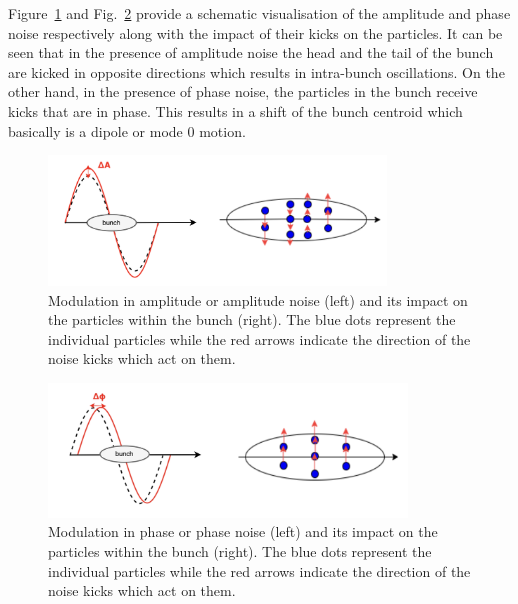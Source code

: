 Figure~\ref{fig:amplitude_noise} and Fig.~\ref{fig:phase_noise} provide a schematic visualisation of the amplitude and phase noise respectively along with the impact of their kicks on the particles. It can be seen that in the presence of amplitude noise the head and the tail of the bunch are kicked in opposite directions which results in intra-bunch oscillations. On the other hand, in the presence of phase noise, the particles in the bunch receive kicks that are in phase. This results in a shift of the bunch centroid which basically is a dipole or mode 0 motion.

\begin{figure}[!h] %
    \centering         
    \includegraphics[width=0.8\textwidth]{images/Ch3/amplitude_noise.png}
        \caption{Modulation in amplitude or amplitude noise (left) and its impact on the particles within the bunch (right). The blue dots represent the individual particles while the red arrows indicate the direction of the noise kicks which act on them.}
        \label{fig:amplitude_noise}
 \end{figure}

 \begin{figure}[!h] %
    \centering         
    \includegraphics[width=0.85\textwidth]{images/Ch3/phase_noise.png}
        \caption{Modulation in phase or phase noise (left) and its impact on the particles within the bunch (right). The blue dots represent the individual particles while the red arrows indicate the direction of the noise kicks which act on them.}
        \label{fig:phase_noise}
 \end{figure}

